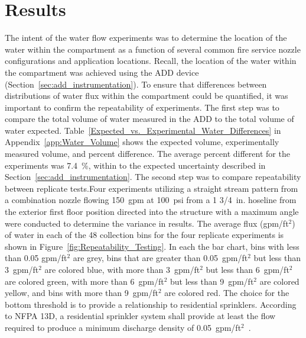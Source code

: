 \documentclass[12pt,oneside]{book}
\begin{document}
\chapter{Results}

The intent of the water flow experiments was to determine the location of the water within the compartment as a function of several common fire service nozzle configurations and application locations. Recall, the location of the water within the compartment was achieved using the ADD device (Section~\ref{sec:add_instrumentation}). To ensure that differences between distributions of water flux within the compartment could be quantified, it was important to confirm the repeatability of experiments. The first step was to compare the total volume of water measured in the ADD to the total volume of water expected. Table~\ref{Expected_vs._Experimental_Water_Differences} in Appendix~\ref{app:Water_Volume} shows the expected volume, experimentally measured volume, and percent difference. The average percent different for the experiments was 7.4~\%, within to the expected uncertainty described in Section~\ref{sec:add_instrumentation}. The second step was to compare repeatability between replicate tests.Four experiments utilizing a straight stream pattern from a combination nozzle flowing 150~gpm at 100~psi from a 1 3/4~in. hoseline from the exterior first floor position directed into the structure with a maximum angle were conducted to determine the variance in results. The average flux (gpm/ft$^2$) of water in each of the 48 collection bins for the four replicate experiments is shown in Figure~\ref{fig:Repeatability_Testing}. In each the ba{}r chart, bins with less than 0.05 gpm/ft$^2$ are grey, bins that are greater than 0.05~gpm/ft$^2$ but less than 3~gpm/ft$^2$ are colored blue, with more than 3~gpm/ft$^2$ but less than 6~gpm/ft$^2$ are colored green, with more than 6~gpm/ft$^2$ but less than 9~gpm/ft$^2$ are colored yellow, and bins with more than 9~gpm/ft$^2$ are colored red. The choice for the bottom threshold is to provide a relationship to residential sprinklers. According to NFPA 13D, a residential sprinkler system shall provide at least the flow required to produce a minimum discharge density of 0.05~gpm/ft$^2$~\cite{NFPA_13D}.
\end{document}
